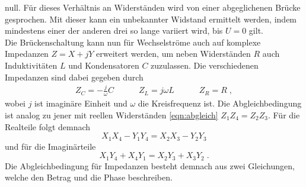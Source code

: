 null. Für dieses Verhältnis an Widerständen wird von einer abgeglichenen Brücke gesprochen. Mit dieser kann ein unbekannter Widstand 
ermittelt werden, indem mindestens einer der anderen drei so lange variiert wird, bis $U=0$ gilt. 
\\\noindent
Die Brückenschaltung kann nun für Wechselströme auch auf komplexe Impedanzen $Z=X+jY$ erweitert werden, um neben Widerständen $R$ auch 
Induktivitäten $L$ und Kondensatoren $C$ zuzulassen. Die verschiedenen Impedanzen sind dabei gegeben durch
\begin{align*}
    Z_C=-\frac{j}{\omega}C \qquad\quad
    Z_L=j\omega L          \qquad\quad
    Z_R=R \;,
\end{align*}  
wobei $j$ ist imaginäre Einheit und $\omega$ die Kreisfrequenz ist. Die Abgleichbedingung ist analog zu jener mit reellen Widerständen
\eqref{eqn:abgleich} $Z_1Z_4=Z_2Z_3$. Für die Realteile folgt demnach 
\begin{equation*}
    X_1X_4-Y_1Y_4=X_2X_3-Y_2Y_3
\end{equation*}
und für die Imaginärteile
\begin{equation*}
    X_1Y_4+X_4Y_1=X_2Y_3+X_3Y_2 \;.
\end{equation*}
Die Abgleichbedingung für Impedanzen besteht demnach aus zwei Gleichungen, welche den Betrag und die Phase beschreiben.

